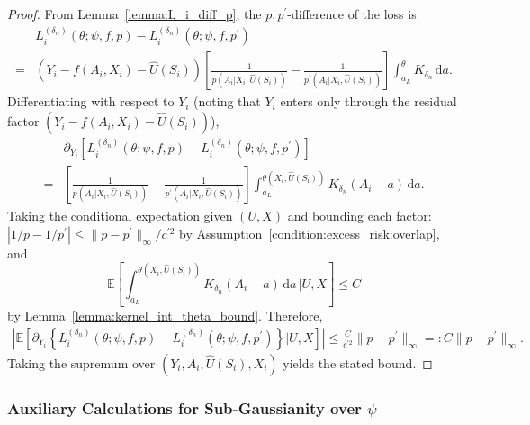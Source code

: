 \documentclass[12pt]{article}
\newcommand{\E}{\mathbb{E}}
\begin{document}
\begin{proof}
From Lemma~\ref{lemma:L_i_diff_p}, the $p,p^\prime$-difference of the loss is
\begin{align*}
&L^{(\delta_n)}_i(\theta;\psi,f,p) - L^{(\delta_n)}_i(\theta;\psi,f,p^\prime)\\
= &\left(Y_i-f(A_i,X_i)-\widehat U(S_i)\right)\left[\frac{1}{p(A_i|X_i,\widehat U(S_i))}-\frac{1}{p^\prime(A_i|X_i,\widehat U(S_i))}\right]\int_{a_L}^{\theta}K_{\delta_n}\,\mathrm{d}a.
\end{align*}
Differentiating with respect to $Y_i$ (noting that $Y_i$ enters only through the residual factor $(Y_i-f(A_i,X_i)-\widehat U(S_i))$),
\begin{align*}
&\partial_{Y_i}\!\left[L^{(\delta_n)}_i(\theta;\psi,f,p) - L^{(\delta_n)}_i(\theta;\psi,f,p^\prime)\right]\\
= &\left[\frac{1}{p(A_i|X_i,\widehat U(S_i))}-\frac{1}{p^\prime(A_i|X_i,\widehat U(S_i))}\right]\int_{a_L}^{\theta(X_i,\widehat U(S_i))}K_{\delta_n}(A_i-a)\,\mathrm{d}a.
\end{align*}
Taking the conditional expectation given $(U,X)$ and bounding each factor: $|1/p-1/p^\prime|\leq\|p-p^\prime\|_\infty/c^{\prime 2}$ by Assumption~\ref{condition:excess_risk:overlap}, and
$$\E\!\left[\int_{a_L}^{\theta(X_i,\widehat U(S_i))}K_{\delta_n}(A_i-a)\,\mathrm{d}a\,\Bigg|U,X\right]\leq C$$
by Lemma~\ref{lemma:kernel_int_theta_bound}.  Therefore,
\begin{align*}
\left|\E\!\left[\partial_{Y_i}\!\left\{L^{(\delta_n)}_i(\theta;\psi,f,p) - L^{(\delta_n)}_i(\theta;\psi,f,p^\prime)\right\}\Big|U,X\right]\right|
\leq \frac{C}{c^{\prime 2}}\|p-p^\prime\|_\infty =: C\|p-p^\prime\|_\infty.
\end{align*}
Taking the supremum over $(Y_i,A_i,\widehat{U}(S_i),X_i)$ yields the stated bound.
\end{proof}

\subsubsection{Auxiliary Calculations for Sub-Gaussianity over $\psi$}
\end{document}
